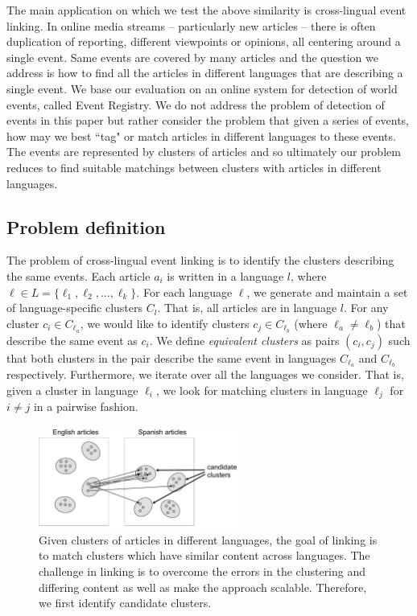 \documentclass[twoside,11pt]{article}
\begin{document}
The main application on which we test the above similarity is cross-lingual event linking. In online media streams -- particularly new articles -- there is often duplication of reporting, different viewpoints or opinions, all centering around a single event. Same events are covered by many articles and the question we address is how to find all the articles in different languages that are describing a single event. We base our evaluation on an online system for detection of world events, called Event Registry. We do not address the problem of detection of events in this paper but rather consider the problem that given a series of events, how may we best ``tag" or match articles in different languages to these events. The events are represented by clusters of articles and so ultimately our problem reduces to find suitable matchings between clusters with articles in different languages.

\subsection{Problem definition}

The problem of cross-lingual event linking is to identify the clusters describing the same events. Each article $a_i$ is written in a language $l$, where $\ell \in L = \{\ell_1,\ell_2,...,\ell_k\}$. For each language $\ell$, we generate and maintain a set of language-specific clusters $C_l$. That is, all articles are in language $l$. For any cluster $c_i \in C_{\ell_a}$, we would like to identify clusters $c_j \in C_{\ell_b}$ (where $\ell_a \neq \ell_b$) that describe the same event as $c_i$. We define \emph{equivalent clusters} as  pairs $(c_i,c_j)$ such that both clusters in the pair describe the same event in languages $C_{\ell_a}$ and $C_{\ell_b}$ respectively. Furthermore, we iterate over all the languages we consider. That is, given a cluster in language $\ell_i$, we look for matching clusters in language $\ell_j$ for $i\neq j$  in a pairwise fashion.

\begin{figure}[tb]
\centering
\includegraphics[width=0.6\textwidth]{clusters}
\caption{\label{fig:clusters}  Given clusters of articles in different languages, the goal of  linking is to match clusters which have similar content across languages. The challenge in linking is to overcome the errors in the clustering and differing content as well as make the approach scalable. Therefore, we first identify candidate clusters. }
\end{figure}
\end{document}
